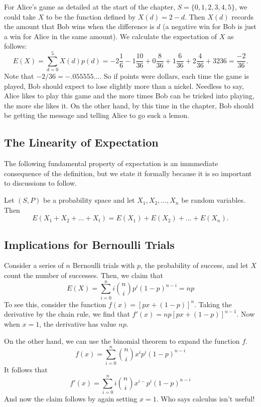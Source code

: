 \begin{example}
For Alice's game as detailed at the start of the chapter,
$S=\{0,1,2,3,4,5\}$, we could take $X$ to be the function defined by
$X(d)= 2-d$.  Then $X(d)$ records the amount that Bob wins when
the difference is $d$ (a negative win for Bob is just a win for Alice
in the same amount).  We calculate the expectation of $X$ as follows:
\[
E(X)=\sum_{d=0}^{5}X(d)p(d)= -2\frac{1}{6} -1\frac{10}{36}+0
     \frac{8}{36}+1\frac{6}{36}+2\frac{4}{36}+3{2}{36}=\frac{-2}{36}.
\]
Note that $-2/36=-.055555\dots$.  So if points were dollars, each
time the game is played, Bob should expect to lose slightly more
than a nickel.  Needless to say, Alice likes to play this game and
the more times Bob can be tricked into playing, the more she likes it.
On the other hand, by this time in the chapter, Bob should be getting
the message and telling Alice to go suck a lemon.
\end{example}

\subsection{The Linearity of Expectation}

The following fundamental property of expectation is an immmediate 
consequence of the definition, but we state it formally because it 
is so important to discussions to follow.

\begin{proposition}\label{prop:linearexpect}
Let $(S,P)$ be a probability space and let $X_1,X_2,\dots,X_n$ be
random variables.  Then
\[
E(X_1+X_2+\dots+X_t)=E(X_1)+E(X_2)+\dots+E(X_n).
\]
\end{proposition}


\subsection{Implications for Bernoulli Trials}

\begin{example}
Consider a series of $n$ Bernoulli trials with $p$, the probability
of success, and let $X$ count the number of successes.  Then, we claim
that
\[
E(X)=\sum_{i=0}^n i\binom{n}{i}p^i(1-p)^{n-i}=np
\]
To see this, consider the function $f(x)=[px+(1-p)]^n$. Taking the
derivative by the chain rule, we find that $f'(x)=np[px+(1-p)]^{n-1}$.
Now when $x=1$,  the derivative has value $np$.

On the other hand, we can use the binomial theorem to expand the function $f$.
\[
f(x)=\sum_{i=0}^n \binom{n}{i}x^ip^i(1-p)^{n-i}
\]
It follows that
\[
f'(x)=\sum_{i=0}^n i \binom{n}{i}x^{i-}p^i(1-p)^{n-i}
\]
And now the claim follows by again setting $x=1$.  Who says calculus isn't
useful!
\end{example}

